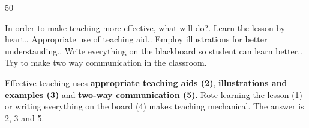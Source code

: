 \begin{question}{50}
{In order to make teaching more effective, what will do?. Learn the lesson by heart.. Appropriate use of teaching aid.. Employ illustrations for better understanding.. Write everything on the blackboard so student can learn better.. Try to make two way communication in the classroom.\par}
\begin{explain}
Effective teaching uses \textbf{appropriate teaching aids (2)}, \textbf{illustrations and examples (3)} and \textbf{two-way communication (5)}. Rote-learning the lesson (1) or writing everything on the board (4) makes teaching mechanical. The answer is 2, 3 and 5.
\end{explain}
\end{question}
